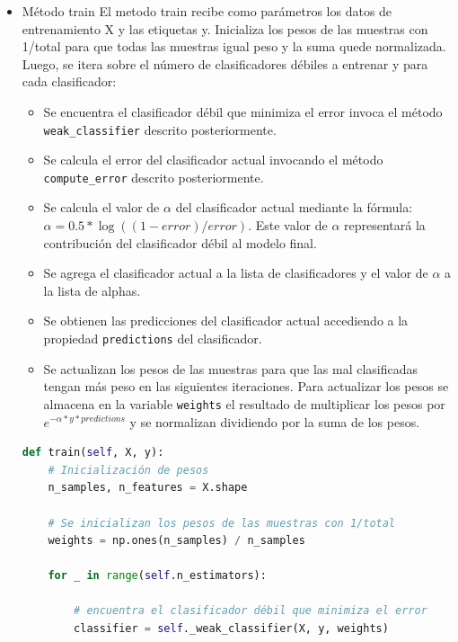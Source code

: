 \documentclass{article}
\begin{document}
\begin{itemize}
        \item Método train \newline
        El metodo train recibe como parámetros los datos de entrenamiento X y las etiquetas y.
        Inicializa los pesos de las muestras con 1/total para que todas las muestras igual peso y la suma quede normalizada.
        Luego, se itera sobre el número de clasificadores débiles a entrenar y para cada clasificador:
        \begin{itemize}
            \item Se encuentra el clasificador débil que minimiza el error invoca el método \texttt{weak\_classifier} descrito posteriormente.
            \item Se calcula el error del clasificador actual invocando el método \texttt{compute\_error} descrito posteriormente.
            \item Se calcula el valor de $\alpha$ del clasificador actual mediante la fórmula:
            \newline $\alpha = 0.5 * \log((1 - error) / error)$. \newline
            Este valor de $\alpha$ representará la contribución del clasificador débil al modelo final.
            \item Se agrega el clasificador actual a la lista de clasificadores y el valor de $\alpha$ a la lista de alphas.
            \item Se obtienen las predicciones del clasificador actual accediendo a la propiedad \texttt{predictions} del clasificador.
            \item Se actualizan los pesos de las muestras para que las mal clasificadas tengan más peso en las siguientes iteraciones.
            Para actualizar los pesos se almacena en la variable \texttt{weights} el resultado de multiplicar los pesos por $e^{-\alpha * y * predictions}$
            y se normalizan dividiendo por la suma de los pesos.
        \end{itemize}
        \begin{lstlisting}[language=Python, caption={train method}, label={lst:train_method}]
def train(self, X, y):
    # Inicialización de pesos
    n_samples, n_features = X.shape

    # Se inicializan los pesos de las muestras con 1/total
    weights = np.ones(n_samples) / n_samples

    for _ in range(self.n_estimators):

        # encuentra el clasificador débil que minimiza el error
        classifier = self._weak_classifier(X, y, weights)


\end{lstlisting}
\end{itemize}
\end{document}
